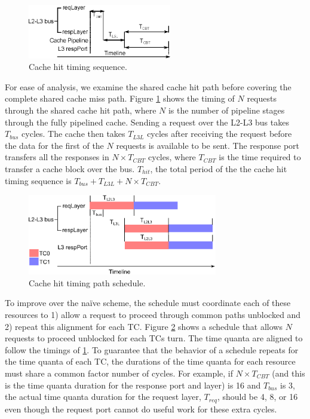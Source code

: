 \begin{figure}
    \begin{center}
        \includegraphics[width=2.4675in]{figs/hit_timing.eps}
        \caption{Cache hit timing sequence.}
        \label{fig:hit_timing}
    \end{center}
\end{figure}

For ease of analysis, we examine the shared cache hit path before covering the 
complete shared cache miss path. Figure \ref{fig:hit_timing} shows the timing 
of $N$ requests through the shared cache hit path, where $N$ is the number of 
pipeline stages through the fully pipelined cache. Sending a request over the 
L2-L3 bus takes $T_{bus}$ cycles.  The cache then takes $T_{L3L}$ cycles after 
receiving the request before the data for the first of the $N$ requests is 
available to be sent. The response port transfers all the responses in $N\times 
T_{CBT}$ cycles, where $T_{CBT}$ is the time required to transfer a cache block 
over the bus. $T_{hit}$, the total period of the the cache hit timing sequence 
is $T_{bus}+T_{L3L}+N\times T_{CBT}$.

\begin{figure}
    \begin{center}
        \includegraphics[width=3.2624in]{figs/hit_schedule.eps}
        \caption{Cache hit timing path schedule.}
        \label{fig:hit_schedule}
    \end{center}
\end{figure}

To improve over the naïve scheme, the schedule must coordinate each of these 
resources to 1) allow a request to proceed through common paths unblocked and 
2) repeat this alignment for each TC. Figure \ref{fig:hit_schedule} shows a 
schedule that allows $N$ requests to proceed unblocked for each TCs turn. The 
time quanta are aligned to follow the timings of \ref{fig:hit_timing}. To 
guarantee that the behavior of a schedule repeats for the time quanta of each 
TC, the durations of the time quanta for each resource must share a common 
factor number of cycles. For example, if $N \times T_{CBT}$ (and this is the 
time quanta duration for the response port and layer) is 16 and $T_{bus}$ is 3, 
the actual time quanta duration for the request layer, $T_{req}$, should be 4, 
8, or 16 even though the request port cannot do useful work for these extra 
cycles. 

